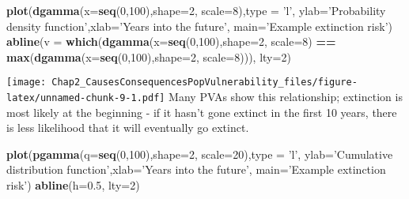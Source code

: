 \documentclass[]{article}
\newenvironment{Shaded}{\begin{snugshade}}{\end{snugshade}}
\newcommand{\KeywordTok}[1]{\textcolor[rgb]{0.13,0.29,0.53}{\textbf{#1}}}
\newcommand{\DataTypeTok}[1]{\textcolor[rgb]{0.13,0.29,0.53}{#1}}
\newcommand{\DecValTok}[1]{\textcolor[rgb]{0.00,0.00,0.81}{#1}}
\newcommand{\FloatTok}[1]{\textcolor[rgb]{0.00,0.00,0.81}{#1}}
\newcommand{\StringTok}[1]{\textcolor[rgb]{0.31,0.60,0.02}{#1}}
\newcommand{\OperatorTok}[1]{\textcolor[rgb]{0.81,0.36,0.00}{\textbf{#1}}}
\newcommand{\NormalTok}[1]{#1}
\begin{document}
\begin{Shaded}
\begin{Highlighting}[]
\KeywordTok{plot}\NormalTok{(}\KeywordTok{dgamma}\NormalTok{(}\DataTypeTok{x=}\KeywordTok{seq}\NormalTok{(}\DecValTok{0}\NormalTok{,}\DecValTok{100}\NormalTok{),}\DataTypeTok{shape=}\DecValTok{2}\NormalTok{, }\DataTypeTok{scale=}\DecValTok{8}\NormalTok{),}\DataTypeTok{type =} \StringTok{'l'}\NormalTok{, }\DataTypeTok{ylab=}\StringTok{'Probability density function'}\NormalTok{,}\DataTypeTok{xlab=}\StringTok{'Years into the future'}\NormalTok{, }\DataTypeTok{main=}\StringTok{'Example extinction risk'}\NormalTok{)}
\KeywordTok{abline}\NormalTok{(}\DataTypeTok{v =} \KeywordTok{which}\NormalTok{(}\KeywordTok{dgamma}\NormalTok{(}\DataTypeTok{x=}\KeywordTok{seq}\NormalTok{(}\DecValTok{0}\NormalTok{,}\DecValTok{100}\NormalTok{),}\DataTypeTok{shape=}\DecValTok{2}\NormalTok{, }\DataTypeTok{scale=}\DecValTok{8}\NormalTok{) }\OperatorTok{==}\StringTok{ }\KeywordTok{max}\NormalTok{(}\KeywordTok{dgamma}\NormalTok{(}\DataTypeTok{x=}\KeywordTok{seq}\NormalTok{(}\DecValTok{0}\NormalTok{,}\DecValTok{100}\NormalTok{),}\DataTypeTok{shape=}\DecValTok{2}\NormalTok{, }\DataTypeTok{scale=}\DecValTok{8}\NormalTok{))), }\DataTypeTok{lty=}\DecValTok{2}\NormalTok{)}
\end{Highlighting}
\end{Shaded}

\texttt{[image: Chap2\_CausesConsequencesPopVulnerability\_files/figure-latex/unnamed-chunk-9-1.pdf]}
Many PVAs show this relationship; extinction is most likely at the
beginning - if it hasn't gone extinct in the first 10 years, there is
less likelihood that it will eventually go extinct.

\begin{Shaded}
\begin{Highlighting}[]
\KeywordTok{plot}\NormalTok{(}\KeywordTok{pgamma}\NormalTok{(}\DataTypeTok{q=}\KeywordTok{seq}\NormalTok{(}\DecValTok{0}\NormalTok{,}\DecValTok{100}\NormalTok{),}\DataTypeTok{shape=}\DecValTok{2}\NormalTok{, }\DataTypeTok{scale=}\DecValTok{20}\NormalTok{),}\DataTypeTok{type =} \StringTok{'l'}\NormalTok{, }\DataTypeTok{ylab=}\StringTok{'Cumulative distribution function'}\NormalTok{,}\DataTypeTok{xlab=}\StringTok{'Years into the future'}\NormalTok{, }\DataTypeTok{main=}\StringTok{'Example extinction risk'}\NormalTok{)}
\KeywordTok{abline}\NormalTok{(}\DataTypeTok{h=}\FloatTok{0.5}\NormalTok{, }\DataTypeTok{lty=}\DecValTok{2}\NormalTok{)}
\end{Highlighting}
\end{Shaded}
\end{document}
